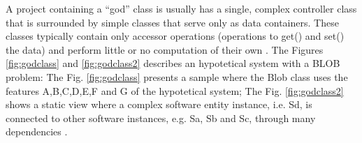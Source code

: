 \documentclass[times]{stvrauth}
\begin{document}
A project containing a “god” class is usually has a single, complex controller class that is surrounded by simple classes that serve only as data containers. These classes typically contain only accessor operations (operations to get() and set() the data) and perform little or no computation of their own \cite{Smith2000}.
The  Figures \ref{fig:godclass} and \ref{fig:godclass2} describes an hypotetical system with a BLOB problem:
The Fig. \ref{fig:godclass} presents a sample where the Blob class uses the features A,B,C,D,E,F and G of the hypotetical system; The Fig. \ref{fig:godclass2}  shows a static view where  a complex software entity instance, i.e. Sd, is connected to other software instances, e.g. Sa, Sb and Sc, through many dependencies \cite{Vetoio2011}\cite{Wert2013a}.
\end{document}
